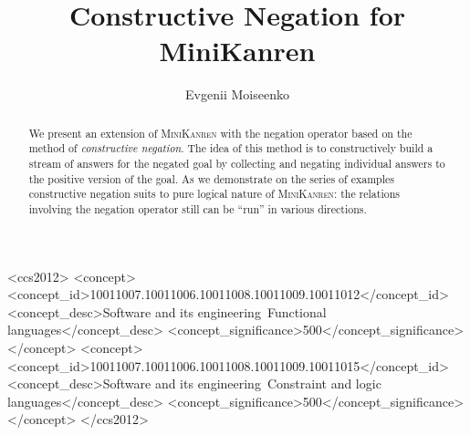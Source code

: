 \documentclass[acmlarge]{acmart}
\begin{document}
\title{Constructive Negation for MiniKanren} 

\author{Evgenii Moiseenko}

\begin{abstract}

We present an extension of \textsc{MiniKanren} with the negation operator
based on the method of \emph{constructive negation}.
The idea of this method is to constructively 
build a stream of answers for the negated goal
by collecting and negating individual answers
to the positive version of the goal.
As we demonstrate on the series of examples 
constructive negation suits to pure logical nature of \textsc{MiniKanren}:  
the relations involving the negation operator 
still can be ``run'' in various directions.

\end{abstract}


%
%
\begin{CCSXML}
  <ccs2012>
    <concept>
      <concept_id>10011007.10011006.10011008.10011009.10011012</concept_id>
      <concept_desc>Software and its engineering~Functional languages</concept_desc>
      <concept_significance>500</concept_significance>
    </concept>
    <concept>
      <concept_id>10011007.10011006.10011008.10011009.10011015</concept_id>
      <concept_desc>Software and its engineering~Constraint and logic languages</concept_desc>
      <concept_significance>500</concept_significance>
    </concept>
  </ccs2012>
\end{CCSXML}
\end{document}
